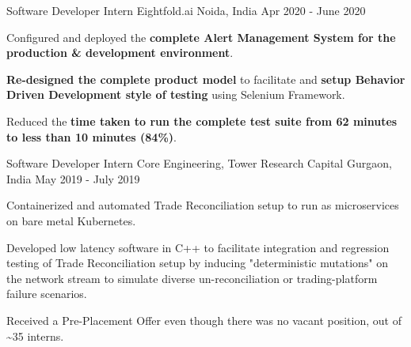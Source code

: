 \begin{cventries}

  \cventry
    {Software Developer Intern} %
    {Eightfold.ai} %
    {Noida, India} %
    {Apr 2020 - June 2020} %
    {
      \begin{cvitems} %
        \item {Configured and deployed the \textbf{complete Alert Management System for the production \& development environment}.}
        \item {\textbf{Re-designed the complete product model} to facilitate and \textbf{setup Behavior Driven Development style of testing} using Selenium Framework.}
        \item {Reduced the \textbf{time taken to run the complete test suite from 62 minutes to less than 10 minutes (84\%)}.}
      \end{cvitems}
    }


  \cventry
    {Software Developer Intern} %
    {Core Engineering, Tower Research Capital} %
    {Gurgaon, India} %
    {May 2019 - July 2019} %
    {
      \begin{cvitems} %
        \item {Containerized and automated Trade Reconciliation setup to run as microservices on bare metal Kubernetes.}
        \item {Developed low latency software in C++ to facilitate integration and regression testing of Trade Reconciliation setup by inducing "deterministic mutations" on the network stream to simulate diverse un-reconciliation or trading-platform failure scenarios.}
        \item {Received a Pre-Placement Offer even though there was no vacant position, out of \textasciitilde 35 interns.}
      \end{cvitems}
    }


\end{cventries}
